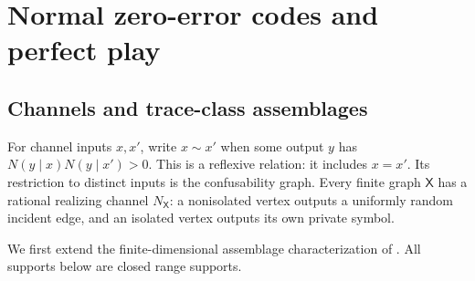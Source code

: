 \section{Normal zero-error codes and perfect play}\label{sec:normal}
\subsection{Channels and trace-class assemblages}
For channel inputs $x,x'$, write $x\sim x'$ when some output $y$ has $N(y\mid x)N(y\mid x')>0$. This is a reflexive relation: it includes $x=x'$. Its restriction to distinct inputs is the confusability graph. Every finite graph $\mathsf X$ has a rational realizing channel $N_{\mathsf X}$: a nonisolated vertex outputs a uniformly random incident edge, and an isolated vertex outputs its own private symbol.

We first extend the finite-dimensional assemblage characterization of \cite{CLMW}. All supports below are closed range supports.

